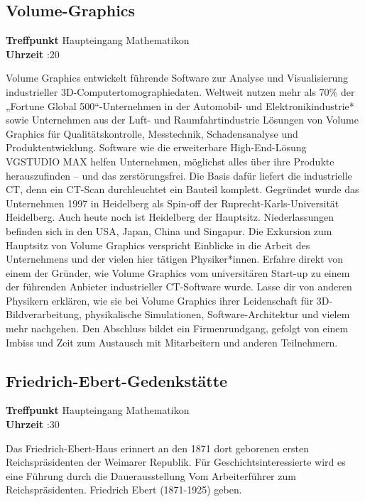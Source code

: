 \subsection*{Volume-Graphics}
\begin{tabbing}
\textbf{Treffpunkt} \quad \quad \quad \= Haupteingang Mathematikon\\
\textbf{Uhrzeit} :20
\end{tabbing}
\hochruecken
Volume Graphics entwickelt führende Software zur Analyse und Visualisierung industrieller 3D-Computertomographiedaten. Weltweit nutzen mehr als 70\% der „Fortune Global 500“-Unternehmen in der Automobil- und Elektronikindustrie* sowie Unternehmen aus der Luft- und Raumfahrtindustrie Lösungen von Volume Graphics für Qualitätskontrolle, Messtechnik, Schadensanalyse und Produktentwicklung. Software wie die erweiterbare High-End-Lösung VGSTUDIO MAX helfen Unternehmen, möglichst alles über ihre Produkte herauszufinden – und das zerstörungsfrei. Die Basis dafür liefert die industrielle CT, denn ein CT-Scan durchleuchtet ein Bauteil komplett. Gegründet wurde das Unternehmen 1997 in Heidelberg als Spin-off der Ruprecht-Karls-Universität Heidelberg. Auch heute noch ist Heidelberg der Hauptsitz. Niederlassungen befinden sich in den USA, Japan, China und Singapur. Die Exkursion zum Hauptsitz von Volume Graphics verspricht Einblicke in die Arbeit des Unternehmens und der vielen hier tätigen Physiker*innen. Erfahre direkt von einem der Gründer, wie Volume Graphics vom universitären Start-up zu einem der führenden Anbieter industrieller CT-Software wurde. Lasse dir von anderen Physikern erklären, wie sie bei Volume Graphics ihrer Leidenschaft für 3D-Bildverarbeitung, physikalische Simulationen, Software-Architektur und vielem mehr nachgehen. Den Abschluss bildet ein Firmenrundgang, gefolgt von einem Imbiss und Zeit zum Austausch mit Mitarbeitern und anderen Teilnehmern. 

\hochruecken
\subsection*{Friedrich-Ebert-Gedenkstätte}
\begin{tabbing}
\textbf{Treffpunkt} \quad \quad \quad \= Haupteingang Mathematikon\\
\textbf{Uhrzeit} :30
\end{tabbing}
\hochruecken
Das Friedrich-Ebert-Haus erinnert an den 1871 dort geborenen ersten Reichspräsidenten der Weimarer Republik. Für Geschichtsinteressierte wird es eine Führung durch die Dauerausstellung \glqq Vom Arbeiterführer zum Reichspräsidenten. Friedrich Ebert (1871-1925)\grqq{} geben.

